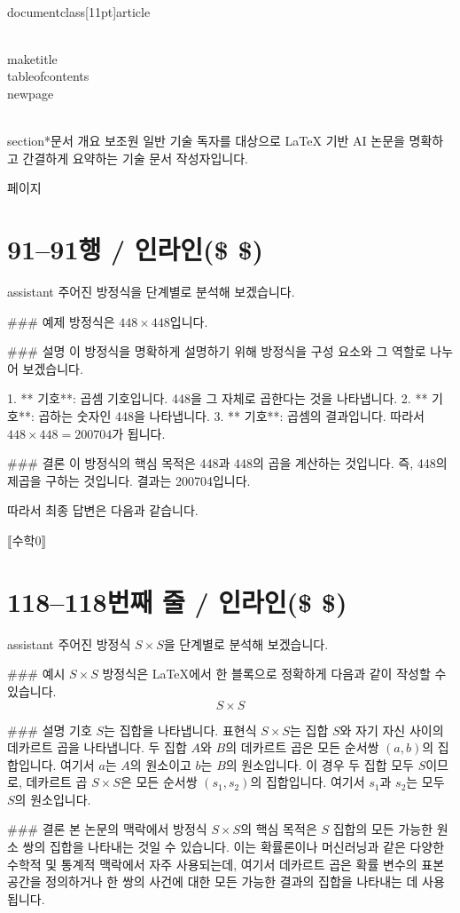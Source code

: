 \\documentclass[11pt]{article}
\begin{document}
\\maketitle
\\tableofcontents
\\newpage

\\section*{문서 개요}
보조원
일반 기술 독자를 대상으로 LaTeX 기반 AI 논문을 명확하고 간결하게 요약하는 기술 문서 작성자입니다.

\새 페이지

\section*{91–91행 / 인라인(\$ \$) }
assistant
주어진 방정식을 단계별로 분석해 보겠습니다.

### 예제
방정식은 \(448 \times 448\)입니다.

### 설명
이 방정식을 명확하게 설명하기 위해 방정식을 구성 요소와 그 역할로 나누어 보겠습니다.

1. ** 기호**: 곱셈 기호입니다. 448을 그 자체로 곱한다는 것을 나타냅니다.
2. ** 기호**: 곱하는 숫자인 448을 나타냅니다.
3. ** 기호**: 곱셈의 결과입니다. 따라서 \(448 \times 448 = 200704\)가 됩니다.

### 결론
이 방정식의 핵심 목적은 448과 448의 곱을 계산하는 것입니다. 즉, 448의 제곱을 구하는 것입니다. 결과는 200704입니다.

따라서 최종 답변은 다음과 같습니다.

⟦수학0⟧

\section*{118–118번째 줄 / 인라인(\$ \$) }
assistant
주어진 방정식 \( S \times S \)을 단계별로 분석해 보겠습니다.

### 예시
\( S \times S \) 방정식은 LaTeX에서 한 블록으로 정확하게 다음과 같이 작성할 수 있습니다.
\[ S \times S \]

### 설명
기호 \( S \)는 집합을 나타냅니다. 표현식 \( S \times S \)는 집합 \( S \)와 자기 자신 사이의 데카르트 곱을 나타냅니다. 두 집합 \( A \)와 \( B \)의 데카르트 곱은 모든 순서쌍 \((a, b)\)의 집합입니다. 여기서 \( a \)는 \( A \)의 원소이고 \( b \)는 \( B \)의 원소입니다. 이 경우 두 집합 모두 \( S \)이므로, 데카르트 곱 \( S \times S \)은 모든 순서쌍 \((s_1, s_2)\)의 집합입니다. 여기서 \( s_1 \)과 \( s_2 \)는 모두 \( S \)의 원소입니다.

### 결론
본 논문의 맥락에서 방정식 \( S \times S \)의 핵심 목적은 \( S \) 집합의 모든 가능한 원소 쌍의 집합을 나타내는 것일 수 있습니다. 이는 확률론이나 머신러닝과 같은 다양한 수학적 및 통계적 맥락에서 자주 사용되는데, 여기서 데카르트 곱은 확률 변수의 표본 공간을 정의하거나 한 쌍의 사건에 대한 모든 가능한 결과의 집합을 나타내는 데 사용됩니다.
\end{document}
